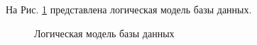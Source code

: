 \documentclass[a4paper,12pt]{article}
\begin{document}
На Рис. \ref{fig:database_l} представлена логическая модель базы данных.

\begin{figure}[]
    \caption{Логическая модель базы данных}
    \label{fig:database_l}
\end{figure}
\end{document}
